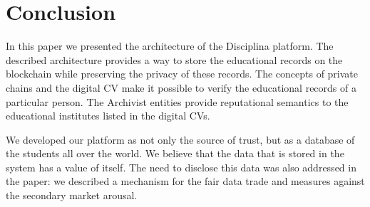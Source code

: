 \section{Conclusion}
In this paper we presented the architecture of the Disciplina platform. The described architecture provides a way to store the educational records on the blockchain while preserving the privacy of these records. The concepts of private chains and the digital CV make it possible to verify the educational records of a particular person. The Archivist entities provide reputational semantics to the educational institutes listed in the digital CVs.

We developed our platform as not only the source of trust, but as a database of the students all over the world. We believe that the data that is stored in the system has a value of itself. The need to disclose this data was also addressed in the paper: we described a mechanism for the fair data trade and measures against the secondary market arousal.



